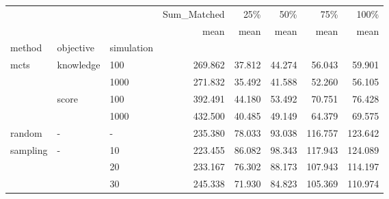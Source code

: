\begin{tabular}{lllrrrrr}
\toprule
         &   &    & Sum\_Matched &    25\% &    50\% &     75\% &    100\% \\
         &   &    &        mean &   mean &   mean &    mean &    mean \\
method & objective & simulation &             &        &        &         &         \\
\midrule
mcts & knowledge & 100 &     269.862 & 37.812 & 44.274 &  56.043 &  59.901 \\
         &   & 1000 &     271.832 & 35.492 & 41.588 &  52.260 &  56.105 \\
         & score & 100 &     392.491 & 44.180 & 53.492 &  70.751 &  76.428 \\
         &   & 1000 &     432.500 & 40.485 & 49.149 &  64.379 &  69.575 \\
random & - & - &     235.380 & 78.033 & 93.038 & 116.757 & 123.642 \\
sampling & - & 10 &     223.455 & 86.082 & 98.343 & 117.943 & 124.089 \\
         &   & 20 &     233.167 & 76.302 & 88.173 & 107.943 & 114.197 \\
         &   & 30 &     245.338 & 71.930 & 84.823 & 105.369 & 110.974 \\
\bottomrule
\end{tabular}
